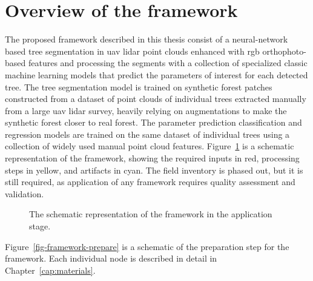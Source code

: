 \section{Overview of the framework}

The proposed framework described in this thesis consist of a neural-network based tree segmentation in \gls{uav} \gls{lidar} point clouds enhanced with \gls{rgb} orthophoto-based features and processing the segments with a collection of specialized classic machine learning models that predict the parameters of interest for each detected tree.
The tree segmentation model is trained on synthetic forest patches constructed from a dataset of point clouds of individual trees extracted manually from a large \gls{uav} \gls{lidar} survey, heavily relying on augmentations to make the synthetic forest closer to real forest.
The parameter prediction classification and regression models are trained on the same dataset of individual trees using a collection of widely used manual point cloud features.
Figure~\ref{fig-framework-apply} is a schematic representation of the framework, showing the required inputs in red, processing steps in yellow, and artifacts in cyan.
The field inventory is phased out, but it is still required, as application of any framework requires quality assessment and validation.

\begin{figure}
\caption[Schematic representation of the framework: application]{\label{fig-framework-apply}The schematic representation of the
framework in the application stage.}
\end{figure}

Figure~\ref{fig-framework-prepare} is a schematic of the preparation step for the framework.
Each individual node is described in detail in Chapter~\ref{cap:materials}.


